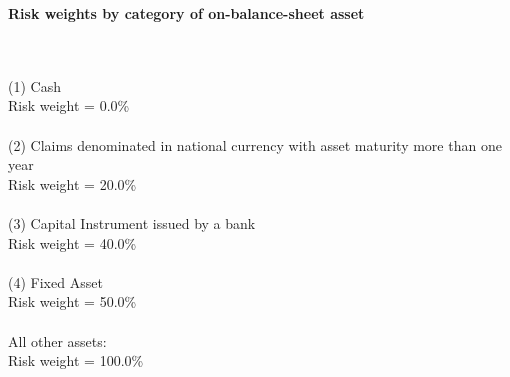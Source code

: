 \documentclass{article}
\begin{document}
\setlength{\parindent}{0em}
\begin{center}{\bf Risk weights by category of on-balance-sheet asset}\end{center}
~\\
~\\

(1) Cash \\
Risk weight = 0.0\%\\

~\\
(2) Claims denominated in national currency with asset maturity more than one year \\
Risk weight = 20.0\%\\

~\\
(3) Capital Instrument issued by a bank \\
Risk weight = 40.0\%\\

~\\
(4) Fixed Asset \\
Risk weight = 50.0\%\\

~\\
All other assets:\\
Risk weight = 100.0\%\\

~\\
\end{document}
